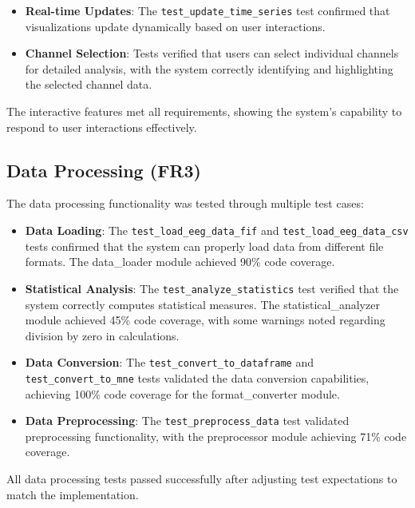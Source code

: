 \documentclass[12pt, titlepage]{article}
\begin{document}
\begin{itemize}
    \item \textbf{Real-time Updates}: The \texttt{test\_update\_time\_series} test confirmed that visualizations update dynamically based on user interactions.
    
    \item \textbf{Channel Selection}: Tests verified that users can select individual channels for detailed analysis, with the system correctly identifying and highlighting the selected channel data.
\end{itemize}

The interactive features met all requirements, showing the system's capability to respond to user interactions effectively.

\subsection{Data Processing (FR3)}
The data processing functionality was tested through multiple test cases:

\begin{itemize}
    \item \textbf{Data Loading}: The \texttt{test\_load\_eeg\_data\_fif} and \texttt{test\_load\_eeg\_data\_csv} tests confirmed that the system can properly load data from different file formats. The data\_loader module achieved 90\% code coverage.
    
    \item \textbf{Statistical Analysis}: The \texttt{test\_analyze\_statistics} test verified that the system correctly computes statistical measures. The statistical\_analyzer module achieved 45\% code coverage, with some warnings noted regarding division by zero in calculations.
    
    \item \textbf{Data Conversion}: The \texttt{test\_convert\_to\_dataframe} and \texttt{test\_convert\_to\_mne} tests validated the data conversion capabilities, achieving 100\% code coverage for the format\_converter module.
    
    \item \textbf{Data Preprocessing}: The \texttt{test\_preprocess\_data} test validated preprocessing functionality, with the preprocessor module achieving 71\% code coverage.
\end{itemize}

All data processing tests passed successfully after adjusting test expectations to match the implementation.
\end{document}
